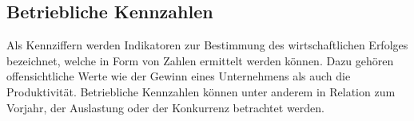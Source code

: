 
\subsection{Betriebliche Kennzahlen}

Als Kennziffern werden Indikatoren zur Bestimmung des wirtschaftlichen Erfolges bezeichnet, welche in Form von Zahlen ermittelt werden können. Dazu gehören offensichtliche Werte wie der Gewinn eines Unternehmens als auch die Produktivität. Betriebliche Kennzahlen können unter anderem in Relation zum Vorjahr, der Auslastung oder der Konkurrenz betrachtet werden.\\


